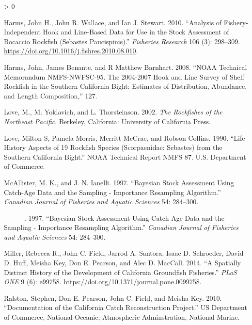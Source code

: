 \documentclass[11pt,
  english,
  a4paper,
]{article}
\newlength{\cslhangindent}
\newenvironment{CSLReferences}[2] %
 {%
  \setlength{\parindent}{0pt}
  \ifodd #1 \everypar{\setlength{\hangindent}{\cslhangindent}}\ignorespaces\fi
  \ifnum #2 > 0
  \setlength{\parskip}{#2\baselineskip}
  \fi
 }%
 {}
\begin{document}
\begin{CSLReferences}{1}{0}
\leavevmode\hypertarget{ref-harms_analysis_2010}{}%
Harms, John H., John R. Wallace, and Ian J. Stewart. 2010. {``Analysis of Fishery-Independent Hook and Line-Based Data for Use in the Stock Assessment of Bocaccio Rockfish ({Sebastes} Paucispinis).''} \emph{Fisheries Research} 106 (3): 298--309. \url{https://doi.org/10.1016/j.fishres.2010.08.010}.

\leavevmode\hypertarget{ref-harms_noaa_2008}{}%
Harms, John, James Benante, and R Matthew Barnhart. 2008. {``{NOAA} {Technical} {Memorandum} {NMFS}-{NWFSC}-95. {The} 2004-2007 {Hook} and {Line} {Survey} of {Shelf} {Rockfish} in the {Southern} {California} {Bight}: {Estimates} of {Distribution}, {Abundance}, and {Length} {Composition},''} 127.

\leavevmode\hypertarget{ref-love_milton_rockfishes_2002}{}%
Love, M., M. Yoklavich, and L. Thorsteinson. 2002. \emph{The Rockfishes of the Northeast Pacific}. Berkeley, California: University of California Press.

\leavevmode\hypertarget{ref-love_life_1990}{}%
Love, Milton S, Pamela Morris, Merritt McCrae, and Robson Collins. 1990. {``Life {History} {Aspects} of 19 {Rockfish} {Species} ({Scorpaenidae}: {Sebastes}) from the {Southern} {California} {Bight}.''} NOAA Technical Report NMFS 87. U.S. Department of Commerce.

\leavevmode\hypertarget{ref-mcallister_bayesian_1997}{}%
McAllister, M. K., and J. N. Ianelli. 1997. {``Bayesian Stock Assessment Using Catch-Age Data and the Sampling - Importance Resampling Algorithm.''} \emph{Canadian Journal of Fisheries and Aquatic Sciences} 54: 284--300.

\leavevmode\hypertarget{ref-mcallister_bayesian_1997}{}%
---------. 1997. {``Bayesian Stock Assessment Using Catch-Age Data and the Sampling - Importance Resampling Algorithm.''} \emph{Canadian Journal of Fisheries and Aquatic Sciences} 54: 284--300.

\leavevmode\hypertarget{ref-miller_spatially_2014}{}%
Miller, Rebecca R., John C. Field, Jarrod A. Santora, Isaac D. Schroeder, David D. Huff, Meisha Key, Don E. Pearson, and Alec D. MacCall. 2014. {``A Spatially Distinct History of the Development of California Groundfish Fisheries.''} \emph{{PLoS} {ONE}} 9 (6): e99758. \url{https://doi.org/10.1371/journal.pone.0099758}.

\leavevmode\hypertarget{ref-ralston_documentation_2010}{}%
Ralston, Stephen, Don E. Pearson, John C. Field, and Meisha Key. 2010. {``Documentation of the {California} Catch Reconstruction Project.''} US Department of Commerce, National Oceanic; Atmospheric Adminstration, National Marine.


\end{CSLReferences}
\end{document}
